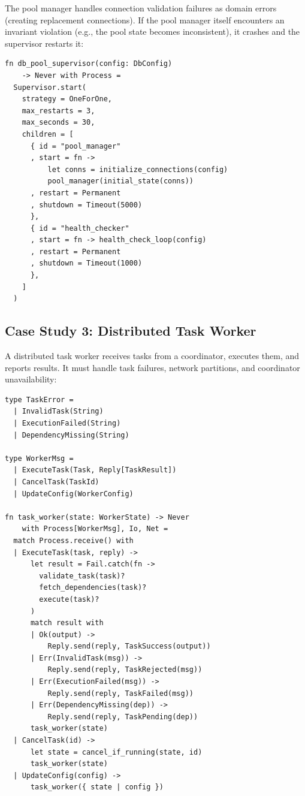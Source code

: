 \documentclass[11pt,twocolumn]{article}
\begin{document}
The pool manager handles connection validation failures as domain errors (creating replacement connections). If the pool manager itself encounters an invariant violation (e.g., the pool state becomes inconsistent), it crashes and the supervisor restarts it:

\begin{lstlisting}
fn db_pool_supervisor(config: DbConfig)
    -> Never with Process =
  Supervisor.start(
    strategy = OneForOne,
    max_restarts = 3,
    max_seconds = 30,
    children = [
      { id = "pool_manager"
      , start = fn ->
          let conns = initialize_connections(config)
          pool_manager(initial_state(conns))
      , restart = Permanent
      , shutdown = Timeout(5000)
      },
      { id = "health_checker"
      , start = fn -> health_check_loop(config)
      , restart = Permanent
      , shutdown = Timeout(1000)
      },
    ]
  )
\end{lstlisting}

\subsection{Case Study 3: Distributed Task Worker}

A distributed task worker receives tasks from a coordinator, executes them, and reports results. It must handle task failures, network partitions, and coordinator unavailability:

\begin{lstlisting}
type TaskError =
  | InvalidTask(String)
  | ExecutionFailed(String)
  | DependencyMissing(String)

type WorkerMsg =
  | ExecuteTask(Task, Reply[TaskResult])
  | CancelTask(TaskId)
  | UpdateConfig(WorkerConfig)

fn task_worker(state: WorkerState) -> Never
    with Process[WorkerMsg], Io, Net =
  match Process.receive() with
  | ExecuteTask(task, reply) ->
      let result = Fail.catch(fn ->
        validate_task(task)?
        fetch_dependencies(task)?
        execute(task)?
      )
      match result with
      | Ok(output) ->
          Reply.send(reply, TaskSuccess(output))
      | Err(InvalidTask(msg)) ->
          Reply.send(reply, TaskRejected(msg))
      | Err(ExecutionFailed(msg)) ->
          Reply.send(reply, TaskFailed(msg))
      | Err(DependencyMissing(dep)) ->
          Reply.send(reply, TaskPending(dep))
      task_worker(state)
  | CancelTask(id) ->
      let state = cancel_if_running(state, id)
      task_worker(state)
  | UpdateConfig(config) ->
      task_worker({ state | config })
\end{lstlisting}
\end{document}
